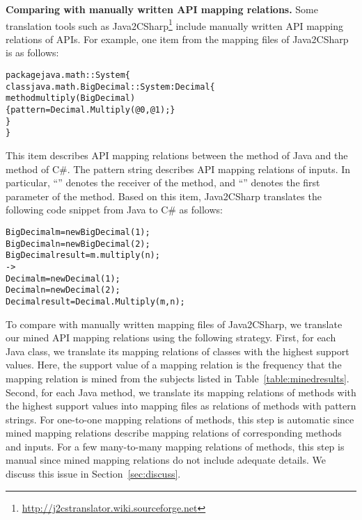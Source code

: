 \textbf{Comparing with manually written API mapping relations.} Some translation
tools such as
Java2CSharp\footnote{\url{http://j2cstranslator.wiki.sourceforge.net}}
include manually written API mapping relations of APIs.
For example, one item from the mapping files of Java2CSharp is as
follows:

\begin{CodeOut}\vspace*{-2ex}
\begin{alltt}
package java.math :: System \{
  class java.math.BigDecimal :: System:Decimal \{
    method multiply(BigDecimal)
       \{ pattern =  Decimal.Multiply(@0, @1); \}
  \}
\}
\end{alltt}
\end{CodeOut}\vspace*{-2ex}

This item describes API mapping relations between the 
method of Java and the  method of C\#. The pattern
string describes API mapping relations of inputs. In particular,
``'' denotes the receiver of the 
method, and ``'' denotes the first parameter of the
 method. Based on this item, Java2CSharp translates
the following code snippet from Java to C\# as follows:

\begin{CodeOut}\vspace*{-2ex}
\begin{alltt}
  BigDecimal m = new BigDecimal(1);
  BigDecimal n = new BigDecimal(2);
  BigDecimal result = m.multiply(n);
  ->
  Decimal m = new Decimal(1);
  Decimal n = new Decimal(2);
  Decimal result = Decimal.Multiply(m,n);
\end{alltt}
\end{CodeOut}\vspace*{-2ex}

To compare with manually written mapping files of Java2CSharp, we
translate our mined API mapping relations using the following strategy. First,
for each Java class, we translate its mapping relations of classes
with the highest support values. Here, the support value of a mapping relation is the frequency that the mapping relation is mined from the subjects listed in Table~\ref{table:minedresults}. Second, for each Java method, we translate its
mapping relations of methods with the highest support values into mapping
files as relations of methods with pattern strings. For one-to-one
mapping relations of methods, this step is automatic since mined
mapping relations describe mapping relations of corresponding
methods and inputs. For a few many-to-many mapping relations of methods,
this step is manual since mined mapping relations do not include
adequate details. We discuss this issue in Section~\ref{sec:discuss}.

